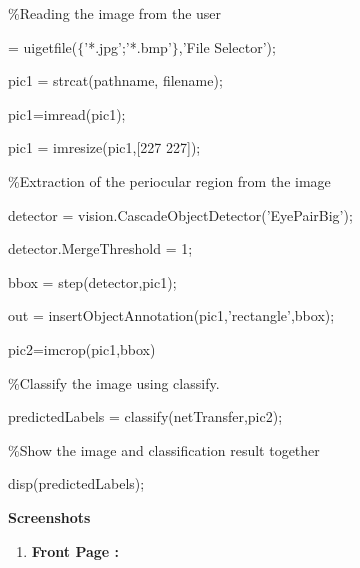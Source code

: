 \documentclass{article} %
\begin{document}
\noindent 

\noindent 

\noindent \%Reading the image from the user

 = uigetfile($\{$'*.jpg';'*.bmp'$\}$,'File Selector');

\noindent pic1 = strcat(pathname, filename);

\noindent pic1=imread(pic1);

\noindent pic1 = imresize(pic1,[227 227]);

\noindent 

\noindent \%Extraction of the periocular region from the image

\noindent detector = vision.CascadeObjectDetector('EyePairBig');

\noindent detector.MergeThreshold = 1;

\noindent bbox = step(detector,pic1);

\noindent out = insertObjectAnnotation(pic1,'rectangle',bbox);

\noindent pic2=imcrop(pic1,bbox)

\noindent 

\noindent \%Classify the image using classify.

\noindent predictedLabels = classify(netTransfer,pic2);

\noindent 

\noindent \%Show the image and classification result together

\noindent disp(predictedLabels);

\noindent 

\noindent 

\noindent 

\noindent 

\noindent 

\noindent 

\noindent 

\noindent 

\noindent 

\noindent 

\noindent 

\noindent 

\noindent 

\noindent 

\noindent \textbf{Screenshots }

\begin{enumerate}
\item \textbf{ Front Page  :}
\end{enumerate}
\end{document}
